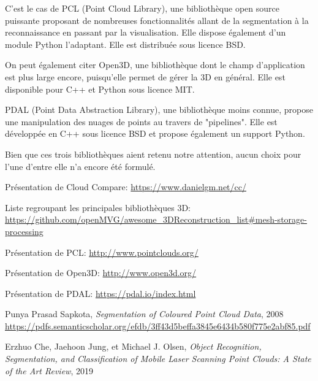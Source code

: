 \documentclass[12pt,titlepage,french]{article}
\begin{document}
C'est le cas de PCL (Point Cloud Library), une bibliothèque open source puissante proposant de nombreuses fonctionnalités allant de la segmentation à la reconnaissance en passant par la visualisation. Elle dispose également d'un module Python l'adaptant. Elle est distribuée sous licence BSD.

On peut également citer Open3D, une bibliothèque dont le champ d'application est plus large encore, puisqu'elle permet de gérer la 3D en général. Elle est disponible pour C++ et Python sous licence MIT.

PDAL (Point Data Abstraction Library), une bibliothèque moins connue, propose une manipulation des nuages de points au travers de "pipelines". Elle est développée en C++ sous licence BSD et propose également un support Python.

Bien que ces trois bibliothèques aient retenu notre attention, aucun choix pour l'une d'entre elle n'a encore été formulé. 

\newpage
\begin{thebibliography}{9}
 Présentation de Cloud Compare:
\url{https://www.danielgm.net/cc/}

 Liste regroupant les principales bibliothèques 3D:
\url{https://github.com/openMVG/awesome_3DReconstruction_list#mesh-storage-processing}

 Présentation de PCL:
\url{http://www.pointclouds.org/}

 Présentation de Open3D:
\url{http://www.open3d.org/}

 Présentation de PDAL:
\url{https://pdal.io/index.html}

 Punya Prasad Sapkota, \textit{Segmentation of Coloured Point Cloud Data}, 2008
\url{https://pdfs.semanticscholar.org/efdb/3ff43d5beffa3845e6434b580f775e2abf85.pdf}

 Erzhuo Che, Jaehoon Jung, et Michael J. Olsen, \textit{Object Recognition, Segmentation, and Classification of Mobile Laser Scanning Point Clouds: A State of the Art Review}, 2019
\end{thebibliography}
\end{document}

